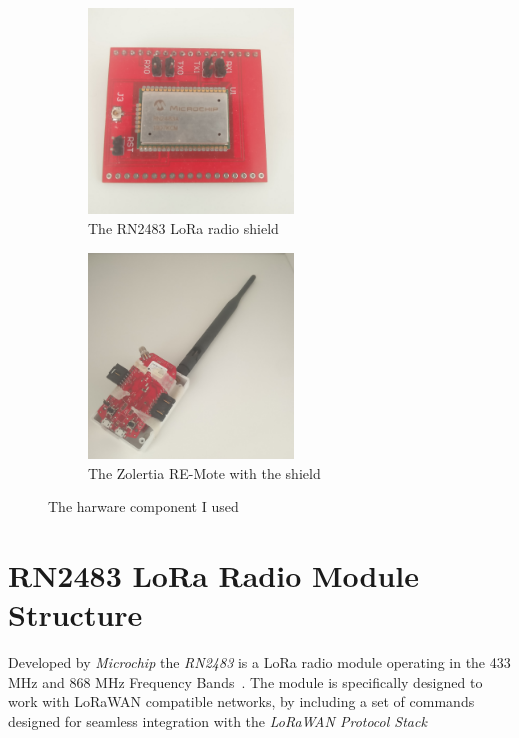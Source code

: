\begin{figure}[H]
\begin{subfigure}[b]{.5\textwidth}
    \centering
    \includegraphics[width=0.6\textwidth]{thesis.tex/chapters/driver/fig/rn2483.jpg}
    \caption{The RN2483 LoRa radio shield\label{fig:rn2483pic}}
\end{subfigure}
\hfill
\begin{subfigure}[b]{.5\textwidth}
    \centering
    \includegraphics[width=0.6\textwidth]{thesis.tex/chapters/driver/fig/zolertia.jpg}
    \caption{The Zolertia RE-Mote with the shield\label{fig:zolpic}}
\end{subfigure}
\caption{The harware component I used\label{fig:hardused}}
\end{figure}

\section{RN2483 LoRa Radio Module Structure}

Developed by \emph{Microchip} the \emph{RN2483} is a LoRa radio module operating in
the 433 MHz and 868 MHz Frequency Bands~\cite{microchip:rn2483}.
The module is specifically designed to work with LoRaWAN compatible networks,
by including a set of commands designed for seamless integration with the
\emph{LoRaWAN Protocol Stack}

